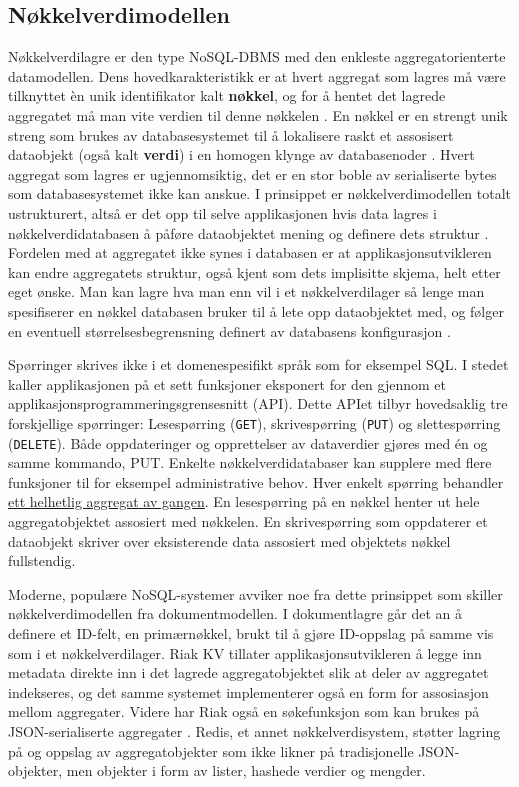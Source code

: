 \subsection{Nøkkelverdimodellen}

Nøkkelverdilagre er den type NoSQL-DBMS med den enkleste aggregatorienterte datamodellen. Dens hovedkarakteristikk er at hvert aggregat som lagres må være tilknyttet èn unik identifikator kalt \textbf{nøkkel}, og for å hentet det lagrede aggregatet må man vite verdien til denne nøkkelen \citep{elmasri2014}. En nøkkel er en strengt unik streng som brukes av databasesystemet til å lokalisere raskt et assosisert dataobjekt (også kalt \textbf{verdi}) i en homogen klynge av databasenoder \citep{elmasri2014}. Hvert aggregat som lagres er ugjennomsiktig, det er en stor boble av serialiserte bytes som databasesystemet ikke kan anskue. I prinsippet er nøkkelverdimodellen totalt ustrukturert, altså er det opp til selve applikasjonen hvis data lagres i nøkkelverdidatabasen å påføre dataobjektet mening og definere dets struktur \citep{elmasri2014}. Fordelen med at aggregatet ikke synes i databasen er at applikasjonsutvikleren kan endre aggregatets struktur, også kjent som dets implisitte skjema, helt etter eget ønske. Man kan lagre hva man enn vil i et nøkkelverdilager så lenge man spesifiserer en nøkkel databasen bruker til å lete opp dataobjektet med, og følger en eventuell størrelsesbegrensning definert av databasens konfigurasjon \citep{sadalage2013}.

Spørringer skrives ikke i et domenespesifikt språk som for eksempel SQL. I stedet kaller applikasjonen på et sett funksjoner eksponert for den gjennom et applikasjonsprogrammeringsgrensesnitt (API). Dette APIet tilbyr hovedsaklig tre forskjellige spørringer: Lesespørring (\texttt{GET}), skrivespørring (\texttt{PUT}) og slettespørring (\texttt{DELETE}). Både oppdateringer og opprettelser av dataverdier gjøres med én og samme kommando, PUT. Enkelte nøkkelverdidatabaser kan supplere med flere funksjoner til for eksempel administrative behov. Hver enkelt spørring behandler \underline{ett helhetlig aggregat av gangen}. En lesespørring på en nøkkel henter ut hele aggregatobjektet assosiert med nøkkelen. En skrivespørring som oppdaterer et dataobjekt skriver over eksisterende data assosiert med objektets nøkkel fullstendig.

Moderne, populære NoSQL-systemer avviker noe fra dette prinsippet som skiller nøkkelverdimodellen fra dokumentmodellen. I dokumentlagre går det an å definere et ID-felt, en primærnøkkel, brukt til å gjøre ID-oppslag på samme vis som i et nøkkelverdilager. Riak KV tillater applikasjonsutvikleren å legge inn metadata direkte inn i det lagrede aggregatobjektet slik at deler av aggregatet indekseres, og det samme systemet implementerer også en form for assosiasjon mellom aggregater. Videre har Riak også en søkefunksjon som kan brukes på JSON-serialiserte aggregater \citep{sadalage2013}. Redis, et annet nøkkelverdisystem, støtter lagring på og oppslag av aggregatobjekter som ikke likner på tradisjonelle JSON-objekter, men objekter i form av lister, hashede verdier og mengder.

